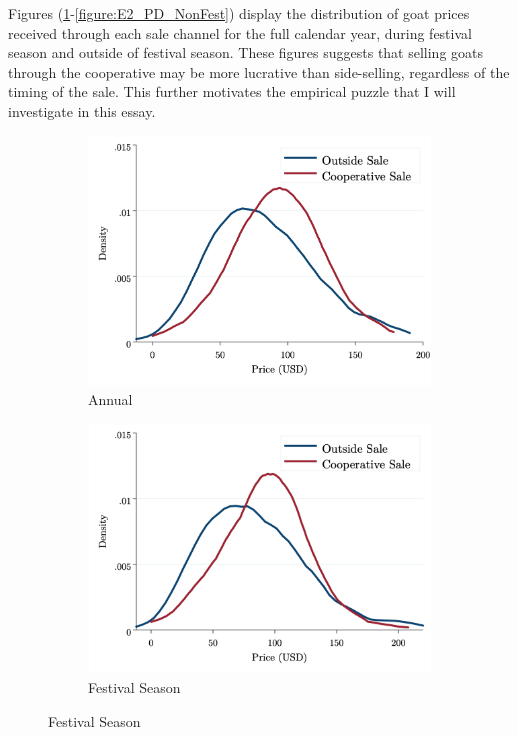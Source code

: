 \documentclass[11pt]{article}
\begin{document}
Figures (\ref{figure:E2_PD_Annual}-\ref{figure:E2_PD_NonFest}) display the distribution of goat prices received through each sale channel for the full calendar year, during festival season and outside of festival season. These figures suggests that selling goats through the cooperative may be more lucrative than side-selling, regardless of the timing of the sale. This further motivates the empirical puzzle that I will investigate in this essay. 

\begin{figure}[H]
\caption{Distribution of Goat Prices by Sale Channel (2018 Sample)}
    \centering
    \begin{subfigure}[t]{.49\textwidth}
    \centering
        \caption{Annual} \label{figure:E2_PD_Annual}
        \includegraphics[width=\linewidth,trim=4 4 4 4,clip]{E2_PriceDensity_Annual.png} 
    \end{subfigure}
    \vspace{.5cm}
    \begin{subfigure}[t]{0.49\textwidth}
        \centering
        \caption{Festival Season} \label{figure:E2_PD_Festival}
        \includegraphics[width=\linewidth,trim=4 4 4 4,clip]{E2_PriceDensity_Festival.png} 

\end{subfigure}
\end{figure}
\end{document}
